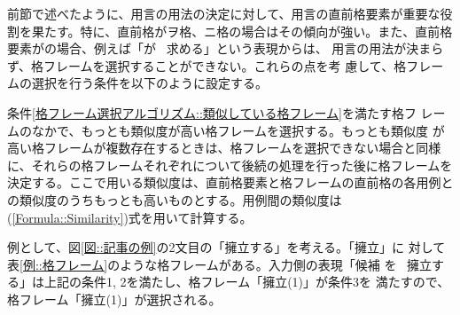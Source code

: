 \documentclass{nlp}
\begin{document}
前節で述べたように、用言の用法の決定に対して、用言の直前格要素が重要な役
割を果たす。特に、直前格がヲ格、ニ格の場合はその傾向が強い。また、直前格
要素がの場合、例えば「が \ 求める」という表現からは、
用言の用法が決まらず、格フレームを選択することができない。これらの点を考
慮して、格フレームの選択を行う条件を以下のように設定する。

条件\ref{格フレーム選択アルゴリズム::類似している格フレーム}を満たす格フ
レームのなかで、もっとも類似度が高い格フレームを選択する。もっとも類似度
が高い格フレームが複数存在するときは、格フレームを選択できない場合と同様
に、それらの格フレームそれぞれについて後続の処理を行った後に格フレームを
決定する。ここで用いる類似度は、直前格要素と格フレームの直前格の各用例と
の類似度のうちもっとも高いものとする。用例間の類似度は
(\ref{Formula::Similarity})式を用いて計算する。

例として、図\ref{図::記事の例}の2文目の「擁立する」を考える。「擁立」に
対して表\ref{例::格フレーム}のような格フレームがある。入力側の表現「候補
を \ 擁立する」は上記の条件1, 2を満たし、格フレーム「擁立(1)」が条件3を
満たすので、格フレーム「擁立(1)」が選択される。
\end{document}
